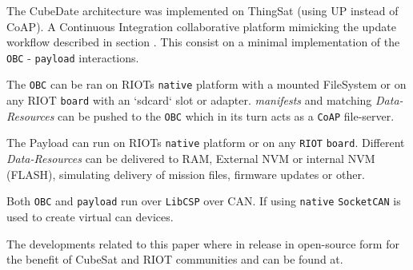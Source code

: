 The CubeDate architecture was implemented on ThingSat (using UP instead of CoAP).
A Continuous Integration collaborative platform mimicking the update workflow described
in section . This consist on a minimal implementation of the
\texttt{OBC} - \texttt{payload} interactions.

The \texttt{OBC} can be ran on RIOTs \texttt{native} platform with a mounted
FileSystem or on any RIOT \texttt{board} with an `sdcard` slot or adapter.
\textit{manifests} and matching \textit{Data-Resources} can be pushed to the
\texttt{OBC} which in its turn acts as a \texttt{CoAP} file-server.

The Payload can run on RIOTs \texttt{native} platform or on any \texttt{RIOT}
\texttt{board}. Different \textit{Data-Resources} can be delivered to RAM,
External NVM or internal NVM (FLASH), simulating delivery of mission files,
firmware updates or other.

Both \texttt{OBC} and \texttt{payload} run over \texttt{LibCSP} over CAN. If
using \texttt{native} \texttt{SocketCAN} is used to create virtual can
devices.


The developments related to this paper where in release in open-source form for
the benefit of CubeSat and RIOT communities and can be found at.

